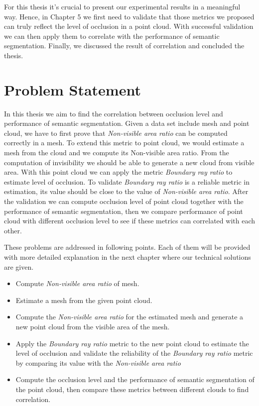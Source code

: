\documentclass[11pt, a4paper,oneside,chapterprefix=false]{scrbook}
\begin{document}
\vspace{10pt}

For this thesis it's crucial to present our experimental results in a meaningful way. Hence, in Chapter 5 we first need to validate that those metrics we proposed can truly reflect the level of occlusion in a point cloud. With successful validation we can then apply them to correlate with the performance of semantic segmentation. Finally, we discussed the result of correlation and concluded the thesis.


\chapter{Problem Statement} \label{chp:problem}

In this thesis we aim to find the correlation between occlusion level and performance of semantic segmentation. Given a data set include mesh and point cloud, we have to first prove that \textit{Non-visible area ratio} can be computed correctly in a mesh. To extend this metric to point cloud, we would estimate a mesh from the cloud and we compute its Non-visible area ratio. From the computation of invisibility we should be able to generate a new cloud from visible area. With this point cloud we can apply the metric \textit{Boundary ray ratio} to estimate level of occlusion. To validate \textit{Boundary ray ratio} is a reliable metric in estimation, its value should be close to the value of \textit{Non-visible area ratio}. After the validation we can compute occlusion level of point cloud together with the performance of semantic segmentation, then we compare performance of point cloud with different occlusion level to see if these metrics can correlated with each other.

\vspace{10pt}

These problems are addressed in following points. Each of them will be provided with more detailed explanation in the next chapter where our technical solutions are given.

\begin{itemize}
    \item Compute \textit{Non-visible area ratio} of mesh.
    \item Estimate a mesh from the given point cloud.
    \item Compute the \textit{Non-visible area ratio} for the estimated mesh and generate a new point cloud from the visible area of the mesh.
    \item Apply the \textit{Boundary ray ratio} metric to the new point cloud to estimate the level of occlusion and validate the reliability of the \textit{Boundary ray ratio} metric by comparing its value with the \textit{Non-visible area ratio}
    \item Compute the occlusion level and the performance of semantic segmentation of the point cloud, then compare these metrics between different clouds to find correlation. 
\end{itemize}
\end{document}
